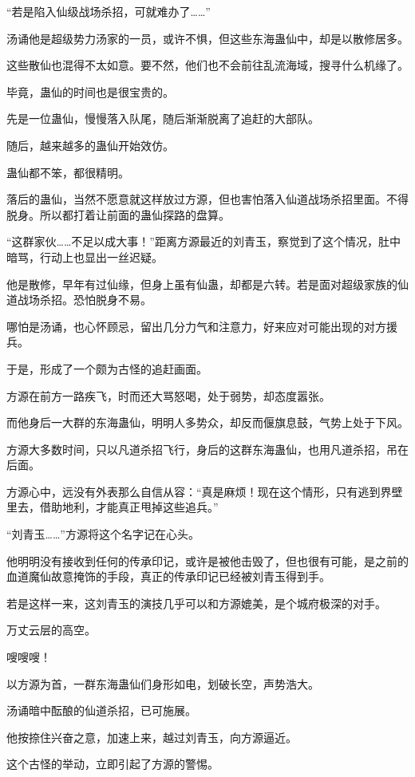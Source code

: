 \begin{this_body}
“若是陷入仙级战场杀招，可就难办了……”

汤诵他是超级势力汤家的一员，或许不惧，但这些东海蛊仙中，却是以散修居多。

这些散仙也混得不太如意。要不然，他们也不会前往乱流海域，搜寻什么机缘了。

毕竟，蛊仙的时间也是很宝贵的。

先是一位蛊仙，慢慢落入队尾，随后渐渐脱离了追赶的大部队。

随后，越来越多的蛊仙开始效仿。

蛊仙都不笨，都很精明。

落后的蛊仙，当然不愿意就这样放过方源，但也害怕落入仙道战场杀招里面。不得脱身。所以都打着让前面的蛊仙探路的盘算。

“这群家伙……不足以成大事！”距离方源最近的刘青玉，察觉到了这个情况，肚中暗骂，行动上也显出一丝迟疑。

他是散修，早年有过仙缘，但身上虽有仙蛊，却都是六转。若是面对超级家族的仙道战场杀招。恐怕脱身不易。

哪怕是汤诵，也心怀顾忌，留出几分力气和注意力，好来应对可能出现的对方援兵。

于是，形成了一个颇为古怪的追赶画面。

方源在前方一路疾飞，时而还大骂怒喝，处于弱势，却态度嚣张。

而他身后一大群的东海蛊仙，明明人多势众，却反而偃旗息鼓，气势上处于下风。

方源大多数时间，只以凡道杀招飞行，身后的这群东海蛊仙，也用凡道杀招，吊在后面。

方源心中，远没有外表那么自信从容：“真是麻烦！现在这个情形，只有逃到界壁里去，借助地利，才能真正甩掉这些追兵。”

“刘青玉……”方源将这个名字记在心头。

他明明没有接收到任何的传承印记，或许是被他击毁了，但也很有可能，是之前的血道魔仙故意掩饰的手段，真正的传承印记已经被刘青玉得到手。

若是这样一来，这刘青玉的演技几乎可以和方源媲美，是个城府极深的对手。

万丈云层的高空。

嗖嗖嗖！

以方源为首，一群东海蛊仙们身形如电，划破长空，声势浩大。

汤诵暗中酝酿的仙道杀招，已可施展。

他按捺住兴奋之意，加速上来，越过刘青玉，向方源逼近。

这个古怪的举动，立即引起了方源的警惕。


\end{this_body}
